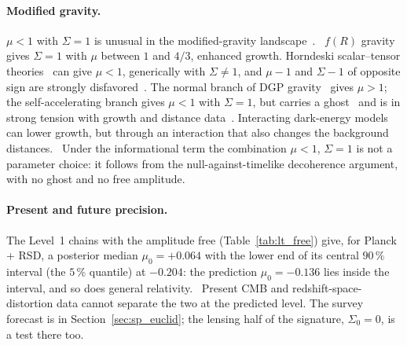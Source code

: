 \paragraph{Modified gravity.} $\mu<1$ with $\Sigma=1$ is unusual in the modified-gravity landscape~\cite{PogosianSilvestri2016}. \observed\ $f(R)$
gravity~\cite{HuSawicki2007} gives $\Sigma=1$ with $\mu$ between $1$ and $4/3$, enhanced growth. Horndeski scalar--tensor theories~\cite{BelliniSawicki2014}
can give $\mu<1$, generically with $\Sigma\neq1$, and $\mu-1$ and $\Sigma-1$ of opposite sign are strongly disfavored~\cite{PogosianSilvestri2016}. The
normal branch of DGP gravity~\cite{DGP2000,KoyamaMaartens2006} gives $\mu>1$; the self-accelerating branch gives $\mu<1$ with $\Sigma=1$, but carries a
ghost~\cite{Koyama2007} and is in strong tension with growth and distance data~\cite{Fang2008}. Interacting dark-energy models can lower growth, but
through an interaction that also changes the background distances. \interp\ Under the informational term the combination $\mu<1$, $\Sigma=1$ is not a
parameter choice: it follows from the null-against-timelike decoherence argument, with no ghost and no free amplitude. \interp

\paragraph{Present and future precision.} The Level~1 chains with the amplitude free (Table~\ref{tab:lt_free}) give, for Planck + RSD, a posterior median
$\mu_0=+0.064$ with the lower end of its central $90\,\%$ interval (the $5\,\%$ quantile) at $-0.204$: the prediction $\mu_0=-0.136$ lies inside the interval, and so does general relativity.
\measured\ Present CMB and redshift-space-distortion data cannot separate the two at the predicted level. The survey forecast is in Section~\ref{sec:sp_euclid}; the
lensing half of the signature, $\Sigma_0=0$, is a test there too.

